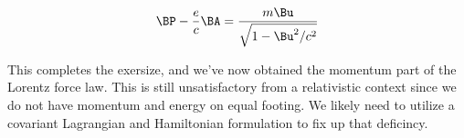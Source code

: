 \begin{align}\label{eqn:hamiltonian:em25}
\BP - \frac{e}{c}\BA = \frac{m \Bu}{\sqrt{1 - \Bu^2/c^2}}
\end{align}

This completes the exersize, and we've now obtained the momentum part of the Lorentz force law.  This is still unsatisfactory from a relativistic context since we do not have momentum and energy on equal footing.  We likely need to utilize a covariant Lagrangian and Hamiltonian formulation to fix up that deficincy.

\EndArticle
